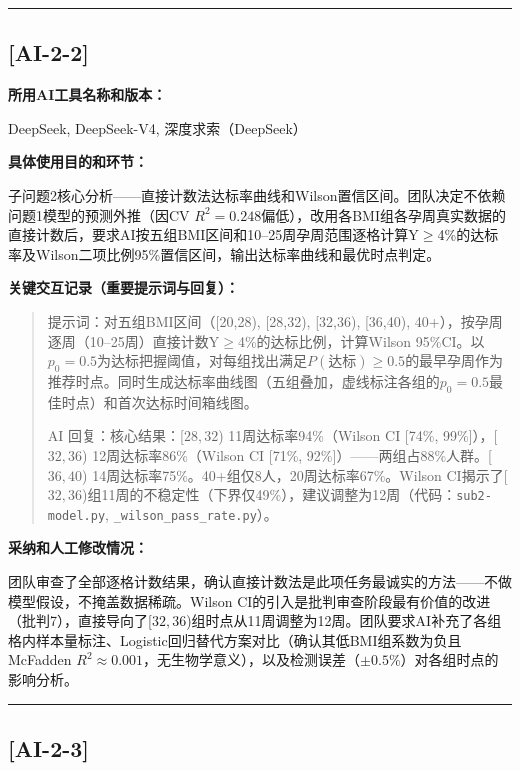\documentclass[12pt,a4paper]{ctexart}
\begin{document}
\vspace{1em}
\hrule
\vspace{1em}

\subsection*{[AI-2-2]}

\textbf{所用AI工具名称和版本：}

DeepSeek, DeepSeek-V4, 深度求索（DeepSeek）

\textbf{具体使用目的和环节：}

子问题2核心分析——直接计数法达标率曲线和Wilson置信区间。团队决定不依赖问题1模型的预测外推（因CV $R^2=0.248$偏低），改用各BMI组各孕周真实数据的直接计数后，要求AI按五组BMI区间和10--25周孕周范围逐格计算Y$\geq$4\%的达标率及Wilson二项比例95\%置信区间，输出达标率曲线和最优时点判定。

\textbf{关键交互记录（重要提示词与回复）：}

\begin{quote}
提示词：对五组BMI区间（[20,28), [28,32), [32,36), [36,40), 40+），按孕周逐周（10--25周）直接计数Y$\geq$4\%的达标比例，计算Wilson 95\%CI。以$p_0=0.5$为达标把握阈值，对每组找出满足$P(\text{达标})\geq0.5$的最早孕周作为推荐时点。同时生成达标率曲线图（五组叠加，虚线标注各组的$p_0=0.5$最佳时点）和首次达标时间箱线图。

AI 回复：核心结果：[$28,32$) 11周达标率94\%（Wilson CI [74\%, 99\%]），[$32,36$) 12周达标率86\%（Wilson CI [71\%, 92\%]）——两组占88\%人群。[$36,40$) 14周达标率75\%。40+组仅8人，20周达标率67\%。Wilson CI揭示了[$32,36$)组11周的不稳定性（下界仅49\%），建议调整为12周（代码：\texttt{sub2-model.py}, \texttt{\_wilson\_pass\_rate.py}）。
\end{quote}

\textbf{采纳和人工修改情况：}

团队审查了全部逐格计数结果，确认直接计数法是此项任务最诚实的方法——不做模型假设，不掩盖数据稀疏。Wilson CI的引入是批判审查阶段最有价值的改进（批判7），直接导向了[$32,36$)组时点从11周调整为12周。团队要求AI补充了各组格内样本量标注、Logistic回归替代方案对比（确认其低BMI组系数为负且McFadden $R^2\approx0.001$，无生物学意义），以及检测误差（$\pm0.5\%$）对各组时点的影响分析。

\vspace{1em}
\hrule
\vspace{1em}

\subsection*{[AI-2-3]}
\end{document}
